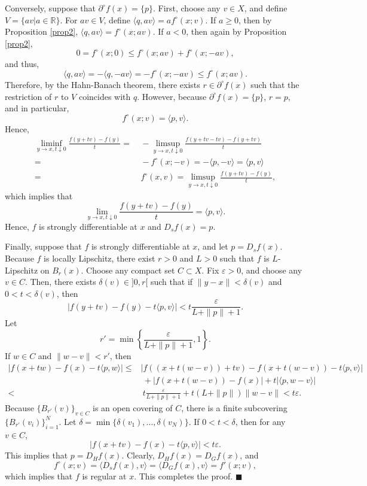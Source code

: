 \documentclass[a4paper,12pt]{article}
\theoremstyle{definition}
\begin{document}
Conversely, suppose that $\partial^{\circ}f(x)=\{p\}$. First, choose any $v\in X$, and define $V=\{av|a\in\mathbb{R}\}$. For $av\in V$, define $\langle q,av\rangle=af^{\circ}(x;v)$. If $a\ge 0$, then by Proposition \ref{prop2}, $\langle q,av\rangle=f^{\circ}(x;av)$. If $a<0$, then again by Proposition \ref{prop2},
\[0=f^{\circ}(x;0)\le f^{\circ}(x;av)+f^{\circ}(x;-av),\]
and thus,
\[\langle q,av\rangle=-\langle q,-av\rangle=-f^{\circ}(x;-av)\le f^{\circ}(x;av).\]
Therefore, by the Hahn-Banach theorem, there exists $r\in \partial^{\circ}f(x)$ such that the restriction of $r$ to $V$ coincides with $q$. However, because $\partial^{\circ}f(x)=\{p\}$, $r=p$, and in particular,
\[f^{\circ}(x;v)=\langle p,v\rangle.\]
Hence,
\begin{align*}
\liminf_{y\to x,t\downarrow 0}\frac{f(y+tv)-f(y)}{t}=&~-\limsup_{y\to x,t\downarrow 0}\frac{f(y+tv-tv)-f(y+tv)}{t}\\
=&~-f^{\circ}(x;-v)=-\langle p,-v\rangle=\langle p,v\rangle\\
=&~f^{\circ}(x,v)=\limsup_{y\to x,t\downarrow 0}\frac{f(y+tv)-f(y)}{t},
\end{align*}
which implies that
\[\lim_{y\to x,t\downarrow 0}\frac{f(y+tv)-f(y)}{t}=\langle p,v\rangle.\]
Hence, $f$ is strongly differentiable at $x$ and $D_sf(x)=p$.

Finally, suppose that $f$ is strongly differentiable at $x$, and let $p=D_sf(x)$. Because $f$ is locally Lipschitz, there exist $r>0$ and $L>0$ such that $f$ is $L$-Lipschitz on $B_r(x)$. Choose any compact set $C\subset X$. Fix $\varepsilon>0$, and choose any $v\in C$. Then, there exists $\delta(v)\in ]0,r[$ such that if $\|y-x\|<\delta(v)$ and $0<t<\delta(v)$, then
\[|f(y+tv)-f(y)-t\langle p,v\rangle|<t\frac{\varepsilon}{L+\|p\|+1}.\]
Let
\[r'=\min\left\{\frac{\varepsilon}{L+\|p\|+1},1\right\}.\]
If $w\in C$ and $\|w-v\|<r'$, then
\begin{align*}
|f(x+tw)-f(x)-t\langle p,w\rangle|\le&|f((x+t(w-v))+tv)-f(x+t(w-v))-t\langle p,v\rangle|\\
&~+|f(x+t(w-v))-f(x)|+t|\langle p,w-v\rangle|\\
<&~t\frac{\varepsilon}{L+\|p\|+1}+t(L+\|p\|)\|w-v\|<t\varepsilon.
\end{align*}
Because $\{B_{r'}(v)\}_{v\in C}$ is an open covering of $C$, there is a finite subcovering $\{B_{r'}(v_i)\}_{i=1}^N$. Let $\delta=\min\{\delta(v_1),...,\delta(v_N)\}$. If $0<t<\delta$, then for any $v\in C$,
\[|f(x+tv)-f(x)-t\langle p,v\rangle|<t\varepsilon.\]
This implies that $p=D_Hf(x)$. Clearly, $D_Hf(x)=D_Gf(x)$, and
\[f^{\circ}(x;v)=\langle D_sf(x),v\rangle=\langle D_Gf(x),v\rangle=f'(x;v),\]
which implies that $f$ is regular at $x$. This completes the proof. $\blacksquare$
\end{document}
